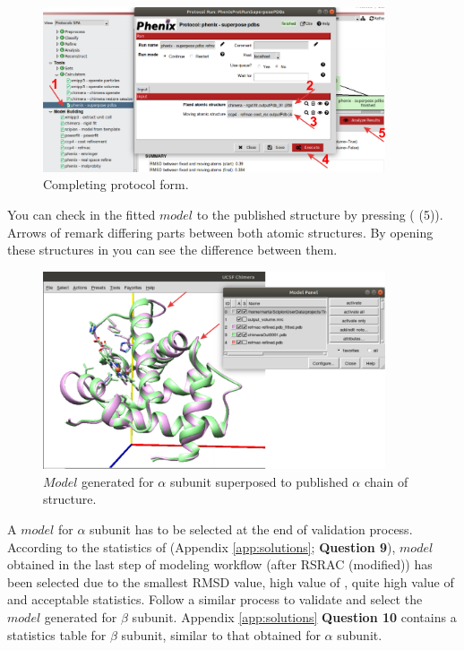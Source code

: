 \begin{itemize}
  \begin{figure}[H]
    \centering 
    \captionsetup{width=.7\linewidth} 
    \includegraphics[width=0.90\textwidth]{Images/Fig37}
    \caption{Completing \phenix {} protocol form.}
    \label{fig:superpose_pdbs_protocol}
    \end{figure}
    
  You can check in \chimera the fitted $model$ to the published structure by pressing  ( (5)). Arrows of  remark differing parts between both atomic structures. By opening these structures in \coot you can see the difference between them.
 
   \begin{figure}[H]
    \centering 
    \captionsetup{width=.7\linewidth} 
    \includegraphics[width=0.90\textwidth]{Images/Fig38}
    \caption{$Model$ generated for  $\alpha$ subunit superposed to published $\alpha$ chain of  structure.}
    \label{fig:superpose_pdbs_chimera}
   \end{figure}
  
  
  \end{itemize}
 
 A $model$ for  $\alpha$ subunit has to be selected at the end of validation process. According to the statistics of  (Appendix \ref{app:solutions}; \textbf{Question 9}), $model$ obtained in the last step of modeling workflow ( after RSRAC (modified)) has been selected due to the smallest RMSD value, high value of \emringer {}, quite high value of \ccmask and acceptable \molprobity statistics. Follow a similar process to validate and select the $model$ generated for  $\beta$ subunit. Appendix \ref{app:solutions} \textbf{Question 10} contains a statistics table for  $\beta$ subunit, similar to that obtained for  $\alpha$ subunit.\\
 
